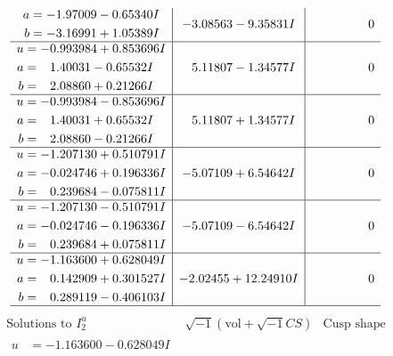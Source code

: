 \documentclass[1p]{elsarticle_modified}
\theoremstyle{definition}
\newcommand{\I}{\sqrt{-1}}
\begin{document}
$$\begin{array}{c|c|c}
\begin{aligned}
a &= -1.97009 - 0.65340 I \\
b &= -3.16991 + 1.05389 I\end{aligned}
 & -3.08563 - 9.35831 I & \phantom{-0.000000 } 0 \\ \hline\begin{aligned}
u &= -0.993984 + 0.853696 I \\
a &= \phantom{-}1.40031 - 0.65532 I \\
b &= \phantom{-}2.08860 + 0.21266 I\end{aligned}
 & \phantom{-}5.11807 - 1.34577 I & \phantom{-0.000000 } 0 \\ \hline\begin{aligned}
u &= -0.993984 - 0.853696 I \\
a &= \phantom{-}1.40031 + 0.65532 I \\
b &= \phantom{-}2.08860 - 0.21266 I\end{aligned}
 & \phantom{-}5.11807 + 1.34577 I & \phantom{-0.000000 } 0 \\ \hline\begin{aligned}
u &= -1.207130 + 0.510791 I \\
a &= -0.024746 + 0.196336 I \\
b &= \phantom{-}0.239684 - 0.075811 I\end{aligned}
 & -5.07109 + 6.54642 I & \phantom{-0.000000 } 0 \\ \hline\begin{aligned}
u &= -1.207130 - 0.510791 I \\
a &= -0.024746 - 0.196336 I \\
b &= \phantom{-}0.239684 + 0.075811 I\end{aligned}
 & -5.07109 - 6.54642 I & \phantom{-0.000000 } 0 \\ \hline\begin{aligned}
u &= -1.163600 + 0.628049 I \\
a &= \phantom{-}0.142909 + 0.301527 I \\
b &= \phantom{-}0.289119 - 0.406103 I\end{aligned}
 & -2.02455 + 12.24910 I & \phantom{-0.000000 } 0\\
 \hline 
 \end{array}$$\newpage$$\begin{array}{c|c|c}  
\text{Solutions to }I^u_{2}& \I (\text{vol} + \sqrt{-1}CS) & \text{Cusp shape}\\
 \hline 
\begin{aligned}
u &= -1.163600 - 0.628049 I \\

\end{aligned}
\end{array}$$
\end{document}
